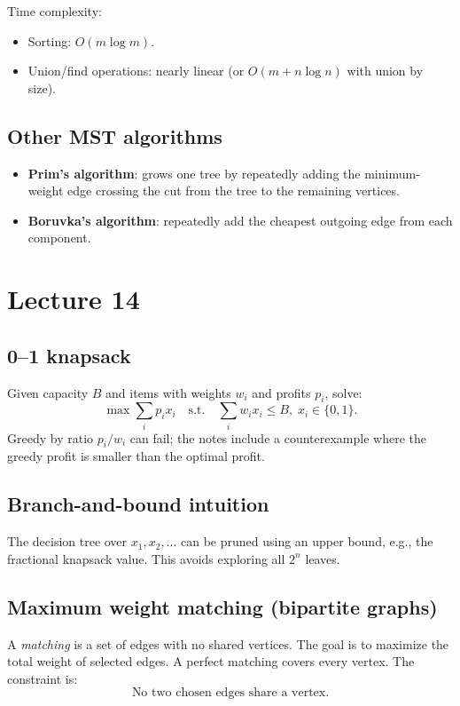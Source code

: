 \documentclass[11pt]{article}
\begin{document}
{{{{Time complexity:
\begin{itemize}
\item Sorting: $O(m \log m)$.
\item Union/find operations: nearly linear (or $O(m + n \log n)$ with union by size).
\end{itemize}

\subsection*{Other MST algorithms}
\begin{itemize}
\item \textbf{Prim's algorithm}: grows one tree by repeatedly adding the minimum-weight edge
crossing the cut from the tree to the remaining vertices.
\item \textbf{Boruvka's algorithm}: repeatedly add the cheapest outgoing edge from each component.
\end{itemize}

\section{Lecture 14}

\subsection*{0--1 knapsack}
Given capacity $B$ and items with weights $w_i$ and profits $p_i$, solve:
\[
\max \sum_i p_i x_i \quad \text{s.t.} \quad \sum_i w_i x_i \le B, \; x_i \in \{0,1\}.
\]
Greedy by ratio $p_i/w_i$ can fail; the notes include a counterexample where the greedy profit is
smaller than the optimal profit.

\subsection*{Branch-and-bound intuition}
The decision tree over $x_1, x_2, \ldots$ can be pruned using an upper bound, e.g., the fractional
knapsack value. This avoids exploring all $2^n$ leaves.

\subsection*{Maximum weight matching (bipartite graphs)}
A \emph{matching} is a set of edges with no shared vertices. The goal is to maximize the total
weight of selected edges. A perfect matching covers every vertex. The constraint is:
\[
\text{No two chosen edges share a vertex.}
\]

}}}}
\end{document}
